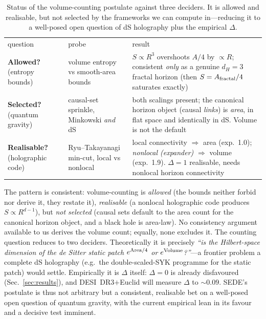 \begin{table}[t]
\caption{Status of the volume-counting postulate against three deciders. It is allowed and realisable,
but not selected by the frameworks we can compute in---reducing it to a well-posed open question of dS
holography plus the empirical $\Delta$.}\label{tab:counting}
\begin{ruledtabular}
\footnotesize
\begin{tabular}{@{}p{}p{}p{}@{}}
question & probe & result \\ \colrule
\textbf{Allowed?} (entropy bounds) & volume entropy vs smooth-area bounds & $S\propto R^3$ overshoots
$A/4$ by $\propto R$; consistent \emph{only} as a genuine $d_H{=}3$ fractal horizon (then
$S=A_{\rm fractal}/4$ saturates exactly) \\
\textbf{Selected?} (quantum gravity) & causal-set sprinkle, Minkowski \emph{and} dS & both scalings
present; the canonical horizon object (causal \emph{links}) is \emph{area}, in flat space and identically
in dS. Volume is not the default \\
\textbf{Realisable?} (holographic code) & Ryu--Takayanagi min-cut, local vs nonlocal & local
connectivity $\Rightarrow$ area (exp.\ 1.0); \emph{nonlocal (expander)} $\Rightarrow$ volume (exp.\ 1.9).
$\Delta{=}1$ realisable, needs nonlocal horizon connectivity \\
\end{tabular}
\end{ruledtabular}
\end{table}

The pattern is consistent: volume-counting is \emph{allowed} (the bounds neither forbid nor derive it,
they restate it), \emph{realisable} (a nonlocal holographic code produces $S\propto R^{d-1}$), but
\emph{not selected} (causal sets default to the area count for the canonical horizon object, and a black
hole is area-law). No consistency argument available to us derives the volume count; equally, none
excludes it. The counting question reduces to two deciders. Theoretically it is precisely \emph{``is the
Hilbert-space dimension of the de Sitter static patch $e^{\rm Area/4}$ or $e^{\rm Volume}$?''}---a
frontier problem a complete dS holography (e.g.\ the double-scaled-SYK programme for the static patch)
would settle. Empirically it is $\Delta$ itself: $\Delta=0$ is already disfavoured
(Sec.~\ref{sec:results}), and DESI~DR3$+$Euclid will measure $\Delta$ to $\sim0.09$. SEDE's postulate is
thus not arbitrary but a consistent, realisable bet on a well-posed open question of quantum gravity,
with the current empirical lean in its favour and a decisive test imminent.

